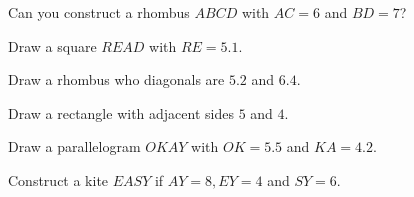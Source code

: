 \item Can you construct a rhombus $ABCD$ with $AC = 6$ and $BD = 7$?
\item Draw a square $READ$ with $RE = 5.1$.
\item Draw a rhombus who diagonals are $5.2$ and $6.4$.
\item Draw a rectangle with adjacent sides $5$ and $4$.
\item Draw a parallelogram $OKAY$ with $OK = 5.5$ and $KA = 4.2$.
\item Construct a kite $EASY$ if $AY = 8, EY = 4$ and $SY = 6$.


%
